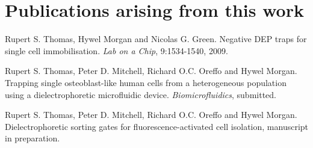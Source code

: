 \section{Publications arising from this work}

Rupert S. Thomas, Hywel Morgan and Nicolas G. Green. Negative DEP traps for single cell immobilisation. \textit{Lab on a Chip}, 9:1534-1540, 2009.

Rupert S. Thomas, Peter D. Mitchell, Richard O.C. Oreffo and Hywel Morgan. Trapping single osteoblast-like human cells from a
heterogeneous population using a dielectrophoretic microfluidic device. \textit{Biomicrofluidics}, submitted.

Rupert S. Thomas, Peter D. Mitchell, Richard O.C. Oreffo and Hywel Morgan. Dielectrophoretic sorting gates for fluorescence-activated cell isolation, manuscript in preparation.